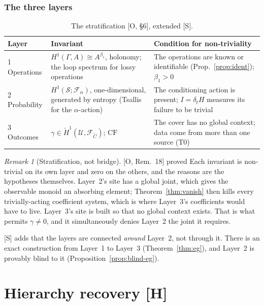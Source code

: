 \documentclass[11pt]{article}
\theoremstyle{definition}
\theoremstyle{remark}
\newtheorem{remark}[theorem]{Remark}
\newcommand{\CF}{\mathrm{CF}}
\newcommand{\src}[1]{\textsf{\small[#1]}}
\newcommand{\st}[1]{\textsf{\small\color{gray}#1}}
\begin{document}
\section{The three layers}

\begin{table}[h]\centering
\begin{tabularx}{\linewidth}{@{}l>{\raggedright}X>{\raggedright\arraybackslash}X@{}}
\toprule
Layer & Invariant & Condition for non-triviality\\
\midrule
1 Operations & $H^1(\Gamma,A)\cong A^{\beta_1}$, holonomy; the loop spectrum for lossy operations & The operations are known or identifiable (Prop.~\ref{prop:ident}); $\beta_1>0$\\
2 Probability & $H^1(\mathcal S;\mathcal F_\alpha)$, one-dimensional, generated by entropy (Tsallis for the $\alpha$-action) & The conditioning action is present; $I=\delta_tH$ measures its failure to be trivial\\
3 Outcomes & $\gamma\in\check H^1(\mathcal U,\mathcal F_{\tilde C})$; $\CF$ & The cover has no global context; data come from more than one source (T0)\\
\bottomrule
\end{tabularx}
\caption{The stratification \src{O, \S6}, extended \src{S}.}
\end{table}

\begin{remark}[Stratification, not bridge]
\src{O, Rem.~18} \st{proved}
Each invariant is non-trivial on its own layer and zero on the others, and the reasons are the hypotheses themselves. Layer~2's site has a global joint, which gives the observable monoid an absorbing element; Theorem~\ref{thm:vanish} then kills every trivially-acting coefficient system, which is where Layer~3's coefficients would have to live. Layer~3's site is built so that no global context exists. That is what permits $\gamma\neq0$, and it simultaneously denies Layer~2 the joint it requires.

\src{S} adds that the layers are connected \emph{around} Layer~2, not through it. There is an exact construction from Layer~1 to Layer~3 (Theorem~\ref{thm:eg}), and Layer~2 is provably blind to it (Proposition~\ref{prop:blind-eg}).
\end{remark}

\part{Hierarchy recovery \src{H}}
\end{document}

